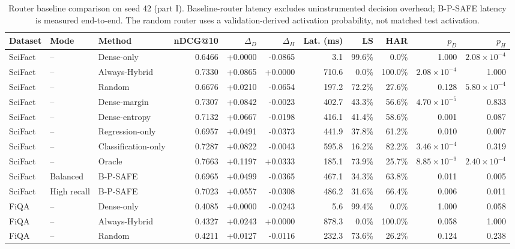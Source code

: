\begin{table}[!htbp]
\centering
\caption{Router baseline comparison on seed 42 (part I). Baseline-router latency excludes uninstrumented decision overhead; B-P-SAFE latency is measured end-to-end. The random router uses a validation-derived activation probability, not matched test activation.}
\label{tab:router_baselines_a}
\scriptsize
\setlength{\tabcolsep}{2.2pt}
\begin{tabular}{lllrrrrrrrr}
\toprule
Dataset & Mode & Method & nDCG@10 & $\Delta_D$ & $\Delta_H$ & Lat. (ms) & LS & HAR & $p_D$ & $p_H$ \\
\midrule
SciFact & -- & Dense-only & 0.6466 & +0.0000 & -0.0865 & 3.1 & 99.6\% & 0.0\% & 1.000 & $2.08\!\times\!10^{-4}$ \\
SciFact & -- & Always-Hybrid & 0.7330 & +0.0865 & +0.0000 & 710.6 & 0.0\% & 100.0\% & $2.08\!\times\!10^{-4}$ & 1.000 \\
SciFact & -- & Random & 0.6676 & +0.0210 & -0.0654 & 197.2 & 72.2\% & 27.6\% & 0.128 & $5.80\!\times\!10^{-4}$ \\
SciFact & -- & Dense-margin & 0.7307 & +0.0842 & -0.0023 & 402.7 & 43.3\% & 56.6\% & $4.70\!\times\!10^{-5}$ & 0.833 \\
SciFact & -- & Dense-entropy & 0.7132 & +0.0667 & -0.0198 & 416.1 & 41.4\% & 58.6\% & 0.001 & 0.087 \\
SciFact & -- & Regression-only & 0.6957 & +0.0491 & -0.0373 & 441.9 & 37.8\% & 61.2\% & 0.010 & 0.007 \\
SciFact & -- & Classification-only & 0.7287 & +0.0822 & -0.0043 & 595.8 & 16.2\% & 82.2\% & $3.46\!\times\!10^{-4}$ & 0.319 \\
SciFact & -- & Oracle & 0.7663 & +0.1197 & +0.0333 & 185.1 & 73.9\% & 25.7\% & $8.85\!\times\!10^{-9}$ & $2.40\!\times\!10^{-4}$ \\
SciFact & Balanced & B-P-SAFE & 0.6965 & +0.0499 & -0.0365 & 467.1 & 34.3\% & 63.8\% & 0.011 & 0.005 \\
SciFact & High recall & B-P-SAFE & 0.7023 & +0.0557 & -0.0308 & 486.2 & 31.6\% & 66.4\% & 0.006 & 0.011 \\
\midrule
FiQA & -- & Dense-only & 0.4085 & +0.0000 & -0.0243 & 5.6 & 99.4\% & 0.0\% & 1.000 & 0.058 \\
FiQA & -- & Always-Hybrid & 0.4327 & +0.0243 & +0.0000 & 878.3 & 0.0\% & 100.0\% & 0.058 & 1.000 \\
FiQA & -- & Random & 0.4211 & +0.0127 & -0.0116 & 232.3 & 73.6\% & 26.2\% & 0.124 & 0.238 \\

\end{tabular}
\end{table}
